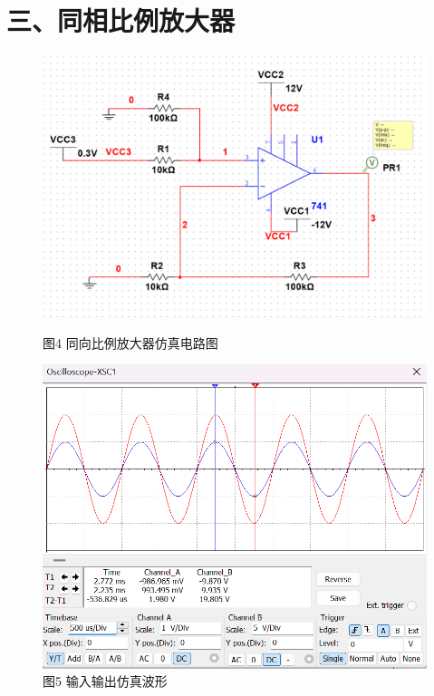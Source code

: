 \documentclass[a4paper,10pt,notitlepage]{article}
\begin{document}
	\section*{三、同相比例放大器}
		\begin{figure}[h]
		\raggedright
		\begin{minipage}{0.4\textwidth}
			\centering
			\includegraphics[width=\textwidth]{4.png}
			\caption*{图4 同向比例放大器仿真电路图}
		\end{minipage}
		\qquad
		\begin{minipage}{0.4\textwidth}
			\centering
			\includegraphics[width=\textwidth]{6.png}
			\caption*{图5 输入输出仿真波形}
		\end{minipage}
	\end{figure}
\end{document}
